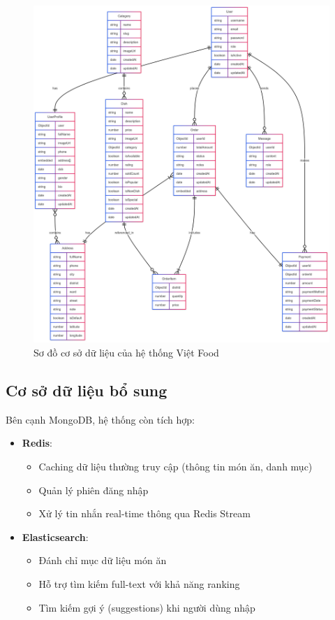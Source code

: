 \begin{figure}[H]
\centering  
\includegraphics[width=\textwidth]{images/database-diagram.png}
\caption{Sơ đồ cơ sở dữ liệu của hệ thống Việt Food}
\label{fig:database-diagram}
\end{figure}

\subsection{Cơ sở dữ liệu bổ sung}
Bên cạnh MongoDB, hệ thống còn tích hợp:
\begin{itemize}
    \item \textbf{Redis}:
    \begin{itemize}
        \item Caching dữ liệu thường truy cập (thông tin món ăn, danh mục)
        \item Quản lý phiên đăng nhập
        \item Xử lý tin nhắn real-time thông qua Redis Stream
    \end{itemize}
    
    \item \textbf{Elasticsearch}:
    \begin{itemize}
        \item Đánh chỉ mục dữ liệu món ăn
        \item Hỗ trợ tìm kiếm full-text với khả năng ranking
        \item Tìm kiếm gợi ý (suggestions) khi người dùng nhập
    \end{itemize}
\end{itemize}

